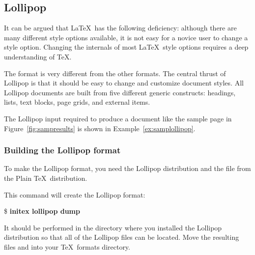 \subsection{Lollipop}

It can be argued that \LaTeX\ has the following deficiency: although there
are many different style options available, it is not easy for a novice
user to change a style option.  Changing the internals of most \LaTeX\ style
options requires a deep understanding of \TeX.

The  format 
is very different from the other formats.
The central thrust of Lollipop is that it should be easy to change
and customize document styles.
All Lollipop documents are built from five different generic
constructs: headings, lists, text blocks, page grids, and external
items.

The Lollipop input required to produce a document like the sample page
in Figure~\ref{fig:sampresults} is shown in Example~\ref{ex:samplollipop}.



\subsubsection{Building the Lollipop format}

To make the Lollipop 
format, you need the Lollipop distribution and the file
 from the Plain \TeX\ distribution.

This command will create the Lollipop format:

\begin{ttindent}
\$ \textbf{initex lollipop \bs{}dump}
\end{ttindent}

It should be performed
in the directory where you installed the Lollipop distribution so
that all of the Lollipop files can be located.  
Move the resulting 
files  and
 into 
your \TeX\ formats directory.

\subsection{\protect\TeXinfo}

